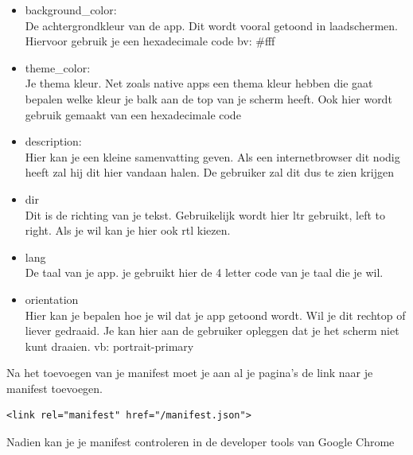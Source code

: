 \begin{itemize}
	\item background\_color: \\
De achtergrondkleur van de app. Dit wordt vooral getoond in laadschermen. Hiervoor gebruik je een hexadecimale code bv: #fff
\\


	\item theme\_color: \\
	Je thema kleur. Net zoals native apps een thema kleur hebben die gaat bepalen welke kleur je balk aan de top van je scherm heeft. Ook hier wordt gebruik gemaakt van een hexadecimale code
	\\
	\item description: \\
	Hier kan je een kleine samenvatting geven. Als een internetbrowser dit nodig heeft zal hij dit hier vandaan halen. De gebruiker zal dit dus te zien krijgen	
	\\
	\item dir \\
	Dit is de richting van je tekst. Gebruikelijk wordt hier ltr gebruikt, left to right. Als je wil kan je hier ook rtl kiezen.
	\\
	\item lang \\
	De taal van je app. je gebruikt hier de 4 letter code van je taal die je wil.
	\\
	\item orientation \\
	Hier kan je bepalen hoe je wil dat je app getoond wordt. Wil je dit rechtop of liever gedraaid. Je kan hier aan de gebruiker opleggen dat je het scherm niet kunt draaien. vb: portrait-primary
	\\
	
\end{itemize}


Na het toevoegen van je manifest moet je aan al je pagina's de link naar je manifest toevoegen.
\begin{lstlisting}
<link rel="manifest" href="/manifest.json">
\end{lstlisting}

Nadien kan je je manifest controleren in de developer tools van Google Chrome


